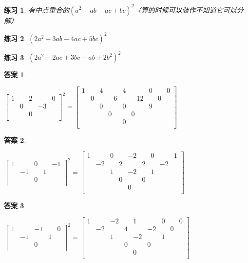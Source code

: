 \documentclass[UTF8]{ctexart}
\newtheorem{3}{练习}
\newtheorem{4}{答案}
\begin{document}
\begin{3}
	有中点重合的$ (a^{2}-ab-ac+bc)^{2} $（算的时候可以装作不知道它可以分解）
\end{3}
\begin{3}
	$ (2a^{2}-3ab-4ac+5bc)^{2} $
\end{3}
\begin{3}
	$ (2a^{2}-2ac
	+3bc+ab+2b^{2})^{2} $
\end{3}
\begin{4}
	\begin{center}
		$ \left[\begin{matrix}
			1& &2& &0\\
			&0& &-3&\\
			& &0& &\\
		\end{matrix}\right]^{2} =
		\left[\begin{matrix}
			1& &4& &4& &0& &0\\
			&0& &-6& &-12& &0&\\
			& &0& &0& &9& &\\
			& & &0& &0& & &\\
			& & & &0& & & &\\
		\end{matrix}\right]$
	\end{center}
\end{4}
\begin{4}
	\begin{center}
		$ \left[\begin{matrix}
			1& &0& &-1\\
			&-1& &1&\\
			& &0& &\\
		\end{matrix}\right]^{2} =
		\left[\begin{matrix}
			1& &0& &-2& &0& &1\\
			&-2& &2& &2& &-2&\\
			& &1& &-2& &1& &\\
			& & &0& &0& & &\\
			& & & &0& & & &\\
		\end{matrix}\right]$
	\end{center}
\end{4}
\begin{4}
	\begin{center}
		$ \left[\begin{matrix}
			1& &-1& &0\\
			&-1& &1&\\
			& &0& &\\
		\end{matrix}\right]^{2} =
		\left[\begin{matrix}
			1& &-2& &1& &0& &0\\
			&-2& &4& &-2& &0&\\
			& &1& &-2& &1& &\\
			& & &0& &0& & &\\
			& & & &0& & & &\\
		\end{matrix}\right]$
	\end{center}
\end{4}
\end{document}
